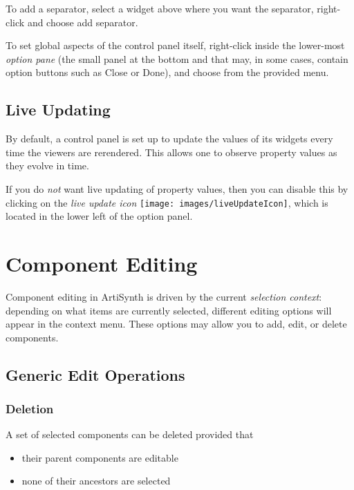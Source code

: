 \documentclass{article}
\begin{document}
To add a separator, select a widget above where you want the
separator, right-click and choose {\sf add separator}.

To set global aspects of the control panel itself, right-click
inside the lower-most {\it option pane} (the small panel at the
bottom and that may, in some cases, contain option buttons such as {\sf Close}
or {\sf Done}), and choose from the provided menu.

\subsection{Live Updating}

By default, a control panel is set up to update the values of its
widgets every time the viewers are rerendered. This allows one to
observe property values as they evolve in time.

If you do {\it not} want live updating of property values, then you can
disable this by clicking on the {\it live update icon}
\texttt{[image: images/liveUpdateIcon]}, which is located in the lower left of the
option panel.

\section{Component Editing}
\label{componentEditingSec}

Component editing in ArtiSynth is driven by the current {\it selection
context}: depending on what items are currently selected, different
editing options will appear in the context menu. These options may
allow you to add, edit, or delete components.

\subsection{Generic Edit Operations}

\subsubsection{Deletion}

A set of selected components can be deleted provided that 

\begin{itemize}

\item their parent components are editable 

\item none of their ancestors are selected

\end{itemize}
\end{document}
